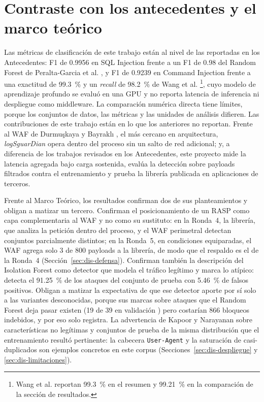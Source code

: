 \section{Contraste con los antecedentes y el marco teórico}

Las métricas de clasificación de este trabajo están al nivel de las reportadas en los
Antecedentes: F1 de 0.9956 en SQL Injection frente a un F1 de 0.98 del Random Forest de Peralta-Garcia et al.
\cite{peralta2024sql}, y F1 de 0.9239 en Command Injection frente a una exactitud de 99.3~\% y un
\textit{recall} de 98.2~\% de Wang et al. \cite{seyyar2024}\footnote{Wang et al. reportan 99.3~\% en
el resumen y 99.21~\% en la comparación de la sección de resultados.}, cuyo modelo de aprendizaje
profundo se evaluó en una GPU y no reporta latencia de inferencia ni despliegue como middleware. La comparación numérica directa tiene límites, porque los
conjuntos de datos, las métricas y las unidades de análisis difieren. Las contribuciones de este
trabajo están en lo que los anteriores no reportan. Frente al WAF de Durmuşkaya y Bayraklı \cite{durmuskaya2025waf}, el más cercano en arquitectura, \textit{logSguarDian} opera dentro del proceso sin un salto de red
adicional; y, a diferencia de los trabajos revisados en los Antecedentes, este proyecto mide la latencia agregada
bajo carga sostenida, evalúa la detección sobre payloads filtrados contra el entrenamiento y prueba
la librería publicada en aplicaciones de terceros.

Frente al Marco Teórico, los resultados confirman dos de sus planteamientos y obligan a matizar un
tercero. Confirman el posicionamiento de un RASP como capa complementaria al WAF y no como su
sustituto: en la Ronda~4, la librería, que analiza la petición dentro del proceso, y el WAF perimetral
detectan conjuntos parcialmente distintos; en la Ronda~5, en condiciones equiparadas, el WAF agrega
solo 3 de 800 payloads a la librería, de modo que el respaldo es el de la Ronda~4
(Sección~\ref{sec:dis-defensa}). Confirman también la descripción
del Isolation Forest como detector que modela el tráfico legítimo y marca lo atípico: detecta el
91.25~\% de los ataques del conjunto de prueba con 5.46~\% de falsos positivos. Obligan a matizar
la expectativa de que ese detector aporte por sí solo a las variantes desconocidas, porque sus
marcas sobre ataques que el Random Forest deja pasar existen (19 de 39 en validación \cite{valenzuela2026ia}) pero
costarían 866 bloqueos indebidos, y por eso solo registra. La advertencia de Kapoor y Narayanan
\cite{kapoor2023} sobre características no legítimas y conjuntos de prueba de la misma distribución
que el entrenamiento resultó pertinente: la cabecera \texttt{User-Agent} y la saturación de
casi-duplicados son ejemplos concretos en este corpus (Secciones~\ref{sec:dis-despliegue} y
\ref{sec:dis-limitaciones}).

